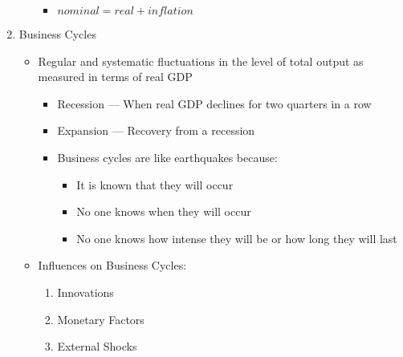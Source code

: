 \documentclass[12pt]{article}
\begin{document}
\begin{enumerate}
\begin{enumerate}
\begin{itemize}
          \item $nominal = real + inflation$

        \end{itemize}

    \end{enumerate}

  \item Business Cycles

    \begin{itemize}

      \item Regular and systematic fluctuations in the level of total output as measured in terms of real GDP

        \begin{itemize}

          \item Recession — When real GDP declines for two quarters in a row

          \item Expansion — Recovery from a recession

          \item Business cycles are like earthquakes because:

            \begin{itemize}

              \item It is known that they will occur

              \item No one knows when they will occur

              \item No one knows how intense they will be or how long they will last

            \end{itemize}

        \end{itemize}

      \item Influences on Business Cycles:

        \begin{enumerate}

          \item Innovations

          \item Monetary Factors

          \item External Shocks

        \end{enumerate}


\end{itemize}
\end{enumerate}
\end{document}
